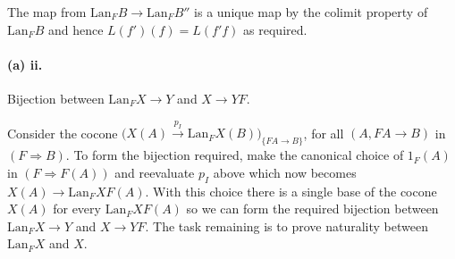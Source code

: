 \documentclass{article}
\begin{document}
The map from $\text{Lan}_FB \rightarrow \text{Lan}_FB''$ is a unique map by the colimit property of $\text{Lan}_FB$ and hence $L(f')(f) = L(f'f)$ as required.

\paragraph{(a) ii.}
Bijection between $\text{Lan}_FX \rightarrow Y$ and $X \rightarrow Y F$.

Consider the cocone $\big(X(A) \xrightarrow{p_I} \text{Lan}_FX(B)\big)_{\{FA \rightarrow B\}}$, for all $\left(A,FA \rightarrow B\right)$ in $\left(F \Rightarrow B\right)$. To form the bijection required, make the canonical choice of $1_F(A)$ in $(F \Rightarrow F(A))$ and reevaluate $p_I$ above which now becomes $X(A) \rightarrow \text{Lan}_FXF(A)$. With this choice there is a single base of the cocone $X(A)$ for every $\text{Lan}_FXF(A)$ so we can form the required bijection between $\text{Lan}_FX \rightarrow Y$ and $X \rightarrow Y F$. The task remaining is to prove naturality between $\text{Lan}_FX$ and $X$.
\end{document}

